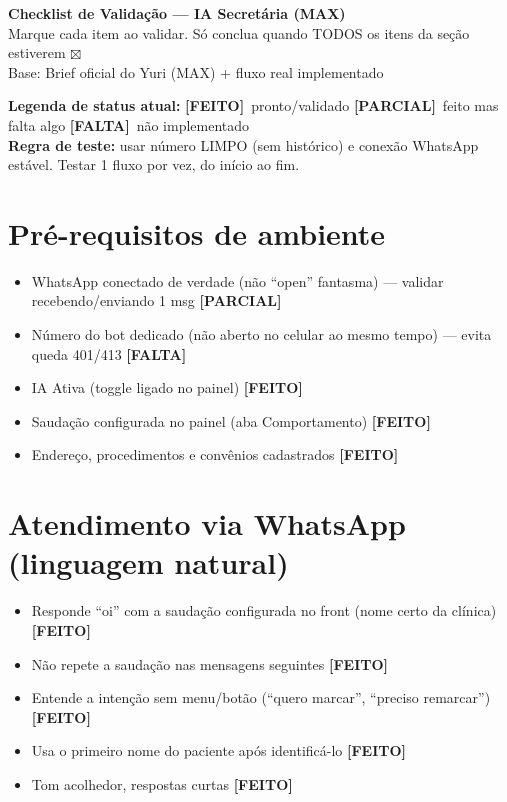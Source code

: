 \documentclass[11pt,a4paper]{article}
\newcommand{\done}{\textcolor{verde}{$\boxtimes$}\ }
\newcommand{\sok}{\textcolor{verde}{\textbf{[FEITO]}}}
\newcommand{\sparc}{\textcolor{ambar}{\textbf{[PARCIAL]}}}
\newcommand{\sfalta}{\textcolor{vermelho}{\textbf{[FALTA]}}}
\begin{document}
\begin{center}
  {\LARGE\bfseries Checklist de Valida\c{c}\~ao --- IA Secret\'aria (MAX)}\\[4pt]
  {\color{cinza}\small Marque cada item ao validar. S\'o conclua quando TODOS os itens da se\c{c}\~ao estiverem \done}\\[2pt]
  {\color{cinza}\small Base: Brief oficial do Yuri (MAX) + fluxo real implementado}
\end{center}

\vspace{4pt}
\begin{tcolorbox}[colback=gray!5,colframe=gray!40,boxrule=0.4pt]
\small\textbf{Legenda de status atual:}\quad
\sok\ pronto/validado \quad
\sparc\ feito mas falta algo \quad
\sfalta\ n\~ao implementado\\[3pt]
\textbf{Regra de teste:} usar n\'umero LIMPO (sem hist\'orico) e conex\~ao WhatsApp est\'avel. Testar 1 fluxo por vez, do in\'icio ao fim.
\end{tcolorbox}

\section{Pr\'e-requisitos de ambiente}
\begin{itemize}
  \item WhatsApp conectado de verdade (n\~ao ``open'' fantasma) --- validar recebendo/enviando 1 msg \sparc
  \item N\'umero do bot dedicado (n\~ao aberto no celular ao mesmo tempo) --- evita queda 401/413 \sfalta
  \item IA Ativa (toggle ligado no painel) \sok
  \item Sauda\c{c}\~ao configurada no painel (aba Comportamento) \sok
  \item Endere\c{c}o, procedimentos e conv\^enios cadastrados \sok
\end{itemize}

\section{Atendimento via WhatsApp (linguagem natural)}
\begin{itemize}
  \item Responde ``oi'' com a sauda\c{c}\~ao configurada no front (nome certo da cl\'inica) \sok
  \item N\~ao repete a sauda\c{c}\~ao nas mensagens seguintes \sok
  \item Entende a inten\c{c}\~ao sem menu/bot\~ao (``quero marcar'', ``preciso remarcar'') \sok
  \item Usa o primeiro nome do paciente ap\'os identific\'a-lo \sok
  \item Tom acolhedor, respostas curtas \sok
\end{itemize}
\end{document}
